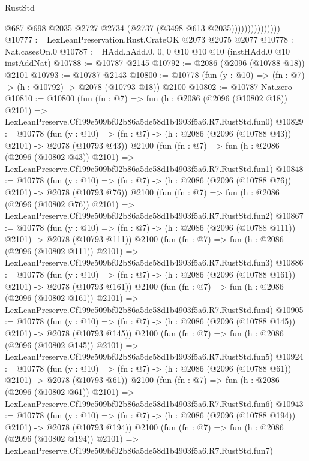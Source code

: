 \begin{lexlean}{RustStd}
\begin{coremodule}
                              @687
                              @698
                              @2035
                              @2727
                              @2734
                              (@2737 (@3498 @613 @2035)))))))))))))))
@10777 := LexLeanPreservation.Rust.CrateOK @2073 @2075 @2077
@10778 := Nat.casesOn.{0}
@10787 := HAdd.hAdd.{0, 0, 0} @10 @10 @10 (instHAdd.{0} @10 instAddNat)
@10788 := @10787 @2145
@10792 := @2086 (@2096 (@10788 @18)) @2101
@10793 := @10787 @2143
@10800 := @10778 (fun (y : @10) => (fn : @7) -> (h : @10792) -> @2078 (@10793 @18)) @2100
@10802 := @10787 Nat.zero
@10810 := @10800
    (fun (fn : @7) =>
    fun (h : @2086 (@2096 (@10802 @18)) @2101) =>
    LexLeanPreserve.Cf199e509bf02b86a5de58d1b4903f5a6.R7.RustStd.fun0)
@10829 := @10778
    (fun (y : @10) => (fn : @7) -> (h : @2086 (@2096 (@10788 @43)) @2101) -> @2078 (@10793 @43))
    @2100
    (fun (fn : @7) =>
    fun (h : @2086 (@2096 (@10802 @43)) @2101) =>
    LexLeanPreserve.Cf199e509bf02b86a5de58d1b4903f5a6.R7.RustStd.fun1)
@10848 := @10778
    (fun (y : @10) => (fn : @7) -> (h : @2086 (@2096 (@10788 @76)) @2101) -> @2078 (@10793 @76))
    @2100
    (fun (fn : @7) =>
    fun (h : @2086 (@2096 (@10802 @76)) @2101) =>
    LexLeanPreserve.Cf199e509bf02b86a5de58d1b4903f5a6.R7.RustStd.fun2)
@10867 := @10778
    (fun (y : @10) => (fn : @7) -> (h : @2086 (@2096 (@10788 @111)) @2101) -> @2078 (@10793 @111))
    @2100
    (fun (fn : @7) =>
    fun (h : @2086 (@2096 (@10802 @111)) @2101) =>
    LexLeanPreserve.Cf199e509bf02b86a5de58d1b4903f5a6.R7.RustStd.fun3)
@10886 := @10778
    (fun (y : @10) => (fn : @7) -> (h : @2086 (@2096 (@10788 @161)) @2101) -> @2078 (@10793 @161))
    @2100
    (fun (fn : @7) =>
    fun (h : @2086 (@2096 (@10802 @161)) @2101) =>
    LexLeanPreserve.Cf199e509bf02b86a5de58d1b4903f5a6.R7.RustStd.fun4)
@10905 := @10778
    (fun (y : @10) => (fn : @7) -> (h : @2086 (@2096 (@10788 @145)) @2101) -> @2078 (@10793 @145))
    @2100
    (fun (fn : @7) =>
    fun (h : @2086 (@2096 (@10802 @145)) @2101) =>
    LexLeanPreserve.Cf199e509bf02b86a5de58d1b4903f5a6.R7.RustStd.fun5)
@10924 := @10778
    (fun (y : @10) => (fn : @7) -> (h : @2086 (@2096 (@10788 @61)) @2101) -> @2078 (@10793 @61))
    @2100
    (fun (fn : @7) =>
    fun (h : @2086 (@2096 (@10802 @61)) @2101) =>
    LexLeanPreserve.Cf199e509bf02b86a5de58d1b4903f5a6.R7.RustStd.fun6)
@10943 := @10778
    (fun (y : @10) => (fn : @7) -> (h : @2086 (@2096 (@10788 @194)) @2101) -> @2078 (@10793 @194))
    @2100
    (fun (fn : @7) =>
    fun (h : @2086 (@2096 (@10802 @194)) @2101) =>
    LexLeanPreserve.Cf199e509bf02b86a5de58d1b4903f5a6.R7.RustStd.fun7)

\end{coremodule}
\end{lexlean}
